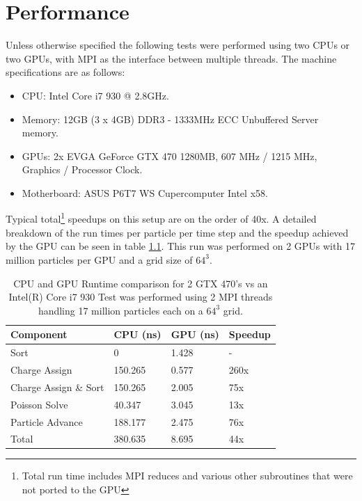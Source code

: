 \chapter{Performance} 
	Unless otherwise specified the following tests were performed using two CPUs or two GPUs, with MPI as the interface between multiple threads. The machine specifications are as follows:
\begin{itemize}
	\item CPU: Intel Core i7 930 @ 2.8GHz.
	\item Memory: 12GB (3 x 4GB) DDR3 - 1333MHz ECC Unbuffered Server memory. 
	\item GPUs: 2x EVGA GeForce GTX 470 1280MB, 607 MHz / 1215 MHz, Graphics / Processor Clock. 
	\item Motherboard: ASUS P6T7 WS Cupercomputer Intel x58.
\end{itemize}

Typical total\footnote[1]{Total run time includes MPI reduces and various other subroutines that were not ported to the GPU} speedups on this setup are on the order of 40x. A detailed breakdown of the run times per particle per time step and the speedup achieved by the GPU can be seen in table \ref{tab:speedup}. This run was performed on 2 GPUs with 17 million particles per GPU and a grid size of $64^3$.
\noindent \begin{table}[h]
\begin{tabular}{| p{4.0cm} | p{3.5cm} | p{2.5cm} | p{4.0cm} |}
\hline
Component & CPU (ns) & GPU (ns) & Speedup \\ \hline
Sort & 0 & 1.428 & - \\ \hline
Charge Assign & 150.265 & 0.577 & 260x \\ \hline
Charge Assign \& Sort & 150.265 & 2.005 & 75x \\ \hline
Poisson Solve & 40.347 & 3.045 & 13x \\ \hline
Particle Advance & 188.177 & 2.475 & 76x \\ \hline
Total\footnote[1] & 380.635 & 8.695 & 44x \\ \hline
\end{tabular}
\caption{CPU and GPU Runtime comparison for 2 GTX 470's vs an Intel(R) Core i7 930 Test was performed using 2 MPI threads handling 17 million particles each on a $64^3$ grid.}
\label{tab:speedup} 
\end{table}

